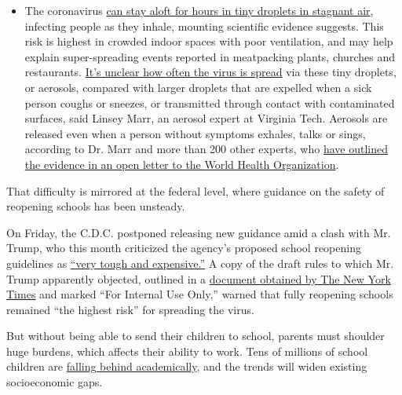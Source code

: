 \begin{itemize}
  \begin{itemize}
  \tightlist
  \item
    The coronavirus
    \href{https://www.nytimes.com/2020/07/04/health/239-experts-with-one-big-claim-the-coronavirus-is-airborne.html?action=click\&pgtype=Article\&state=default\&region=MAIN_CONTENT_3\&context=storylines_faq}{can
    stay aloft for hours in tiny droplets in stagnant air}, infecting
    people as they inhale, mounting scientific evidence suggests. This
    risk is highest in crowded indoor spaces with poor ventilation, and
    may help explain super-spreading events reported in meatpacking
    plants, churches and restaurants.
    \href{https://www.nytimes.com/2020/07/06/health/coronavirus-airborne-aerosols.html?action=click\&pgtype=Article\&state=default\&region=MAIN_CONTENT_3\&context=storylines_faq}{It's
    unclear how often the virus is spread} via these tiny droplets, or
    aerosols, compared with larger droplets that are expelled when a
    sick person coughs or sneezes, or transmitted through contact with
    contaminated surfaces, said Linsey Marr, an aerosol expert at
    Virginia Tech. Aerosols are released even when a person without
    symptoms exhales, talks or sings, according to Dr. Marr and more
    than 200 other experts, who
    \href{https://academic.oup.com/cid/article/doi/10.1093/cid/ciaa939/5867798}{have
    outlined the evidence in an open letter to the World Health
    Organization}.
  \end{itemize}
\end{itemize}

That difficulty is mirrored at the federal level, where guidance on the
safety of reopening schools has been unsteady.

On Friday, the C.D.C. postponed releasing new guidance amid a clash with
Mr. Trump, who this month criticized the agency's proposed school
reopening guidelines as
\href{https://www.nytimes.com/2020/07/08/us/politics/trump-schools-reopening.html}{``very
tough and expensive.''} A copy of the draft rules to which Mr. Trump
apparently objected, outlined in a
\href{https://www.nytimes.com/2020/07/10/us/politics/trump-schools-reopening.html}{document
obtained by The New York Times} and marked ``For Internal Use Only,''
warned that fully reopening schools remained ``the highest risk'' for
spreading the virus.

But without being able to send their children to school, parents must
shoulder huge burdens, which affects their ability to work. Tens of
millions of school children are
\href{https://www.nytimes.com/2020/06/05/us/coronavirus-education-lost-learning.html}{falling
behind academically}, and the trends will widen existing socioeconomic
gaps.

